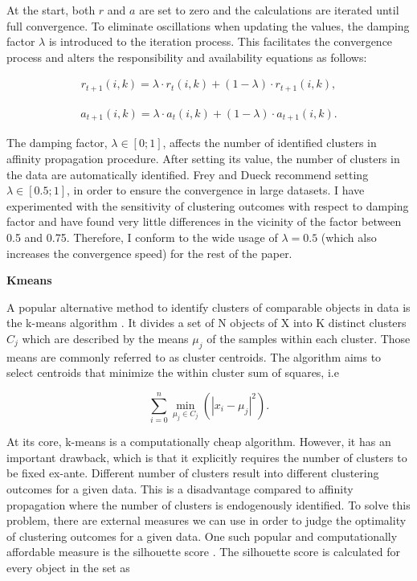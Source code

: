 \documentclass[a4paper,12pt]{article}
\newcommand{\citeyearonly}[1]{\citeyearpar{#1}}
\begin{document}
At the start, both $r$ and $a$ are set to zero and the calculations are iterated until full convergence. To eliminate oscillations when updating the values, the damping factor $\lambda$ is introduced to the iteration process. This facilitates the convergence process and alters the responsibility and availability equations as follows:

\begin{align}\label{eq:responsibilityAffinityPropagation}
    r_{t+1}\left(i,k\right) = \lambda \cdot r_t\left(i,k\right) + (1-\lambda) \cdot r_{t+1}\left(i,k\right),
\end{align}

\begin{align}
    a_{t+1}\left(i,k\right) = \lambda \cdot a_t\left(i,k\right) + (1-\lambda) \cdot a_{t+1}\left(i,k\right).
\end{align}


The damping factor,  $\lambda\in[0;1]$, affects the number of identified clusters in affinity propagation procedure. After setting its value, the number of clusters in the data are automatically identified. Frey and Dueck \citeyearonly{freyDueck07} recommend setting  $\lambda\in[0.5;1]$, in order to ensure the convergence in large datasets. I have experimented with the sensitivity of clustering outcomes with respect to damping factor and have found very little differences in the vicinity of the factor between 0.5 and 0.75. Therefore, I conform to the wide usage of $\lambda=0.5$ (which also increases the convergence speed) for the rest of the paper.

\textbf{Kmeans}

A popular alternative method to identify clusters of comparable objects in data is the k-means algorithm \citep{lloyd82}. It divides a set of N objects of X into K distinct clusters $C_j$  which are described by the means $\mu_j$ of the samples within each cluster. Those means are commonly referred to as cluster centroids. The algorithm aims to select centroids that minimize the within cluster sum of squares, i.e

$$\sum_{i=0}^{n}\min_{\mu_j\in C_j}\left(\left.\left|x_i-\mu_j\right|^2\right.\right) .$$

At its core, k-means is a computationally cheap algorithm. However, it has an important drawback, which is that it explicitly requires the number of clusters to be fixed ex-ante. Different number of clusters result into different clustering outcomes for a given data. This is a disadvantage compared to affinity propagation where the number of clusters is endogenously identified. To solve this problem, there are external measures we can use in order to judge the optimality of clustering outcomes for a given data. One such popular and computationally affordable measure is the silhouette score \citep{rousseeuw1987silhouettes}. The silhouette score is calculated for every object in the set as
\end{document}

